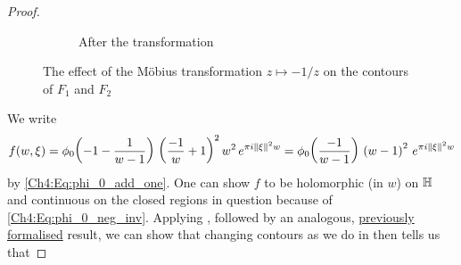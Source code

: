 \begin{proof}
\begin{figure}[htb]
\begin{subfigure}{0.4\linewidth}
            \caption{After the transformation}
        \end{subfigure}
        \caption{The effect of the Möbius transformation $z \mapsto -1/z$ on the contours of $F_1$ and $F_2$}
        \label{Ch4:Fig:Eigenfunction_Mobius_Contours}
    \end{figure}
    We write
    \begin{align*}
        f\!\left( w, \xi \right) = \phi_0\!\left( -1 - \frac{1}{w - 1} \right) \, \left( \frac{-1}{w} + 1 \right)^2 w^2 \, e^{\pi i \left\lVert \xi \right\rVert^2 w}
        = \phi_0\!\left( \frac{-1}{w - 1} \right) \, \left( w - 1 \right)^2 \, e^{\pi i \left\lVert \xi \right\rVert^2 w}
    \end{align*}
    by \eqref{Ch4:Eq:phi_0_add_one}. One can show $f$ to be holomorphic (in $w$) on $\mathbb{H}$ and continuous on the closed regions in question because of \eqref{Ch4:Eq:phi_0_neg_inv}. Applying , followed by an analogous, \href{https://github.com/leanprover-community/mathlib4/blob/88928cefd7edb1ba61623bffd4e86389dfe1f648/Mathlib/Analysis/Complex/CauchyIntegral.lean#L245}{previously formalised} result, we can show that changing contours as we do in  then tells us that

\end{proof}
